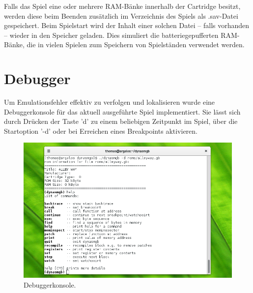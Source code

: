 \documentclass[a4paper]{scrartcl}
\begin{document}
Falls das Spiel eine oder mehrere RAM-Bänke innerhalb der Cartridge besitzt, werden diese beim Beenden zusätzlich im Verzeichnis des Spiels als .sav-Datei gespeichert. Beim Spielstart wird der Inhalt einer solchen Datei -- falls vorhanden -- wieder in den Speicher geladen. Dies simuliert die batteriegepufferten RAM-Bänke, die in vielen Spielen zum Speichern von Spielständen verwendet werden.

\section{Debugger}

Um Emulationsfehler effektiv zu verfolgen und lokalisieren wurde eine Debuggerkonsole für das aktuell ausgeführte Spiel implementiert. Sie lässt sich durch Drücken der Taste 'd' zu einem beliebigen Zeitpunkt im Spiel, über die Startoption '-d' oder bei Erreichen eines Breakpoints aktivieren.

\begin{figure}[htbp]
\centering
\includegraphics[width=0.8\linewidth]{img/debugger}
\caption{Debuggerkonsole.}
\label{img:debugger}
\end{figure}
\end{document}
